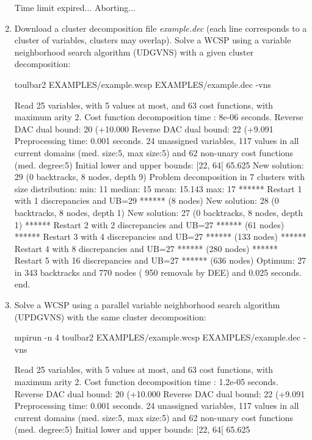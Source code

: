 \begin{enumerate}
{\begin{DoxyCode}
Time limit expired... Aborting...
\end{DoxyCode}}
\item Download a cluster decomposition file {\em example.dec} (each line corresponds to a cluster of variables, clusters may overlap). Solve a WCSP using a variable neighborhood search algorithm (UDGVNS) with a given cluster decomposition:
\begin{DoxyCode}
	toulbar2 EXAMPLES/example.wcsp EXAMPLES/example.dec -vns
\end{DoxyCode}
{\scriptsize
\begin{DoxyCode}
Read 25 variables, with 5 values at most, and 63 cost functions, with maximum arity 2.
Cost function decomposition time : 8e-06 seconds.
Reverse DAC dual bound: 20 (+10.000%
Reverse DAC dual bound: 22 (+9.091%
Preprocessing time: 0.001 seconds.
24 unassigned variables, 117 values in all current domains (med. size:5, max size:5) and 62 non-unary cost functions (med. degree:5)
Initial lower and upper bounds: [22, 64[ 65.625%
New solution: 29 (0 backtracks, 8 nodes, depth 9)
Problem decomposition in 7 clusters with size distribution: min: 11 median: 15 mean: 15.143 max: 17
****** Restart 1 with 1 discrepancies and UB=29 ****** (8 nodes)
New solution: 28 (0 backtracks, 8 nodes, depth 1)
New solution: 27 (0 backtracks, 8 nodes, depth 1)
****** Restart 2 with 2 discrepancies and UB=27 ****** (61 nodes)
****** Restart 3 with 4 discrepancies and UB=27 ****** (133 nodes)
****** Restart 4 with 8 discrepancies and UB=27 ****** (280 nodes)
****** Restart 5 with 16 discrepancies and UB=27 ****** (636 nodes)
Optimum: 27 in 343 backtracks and 770 nodes ( 950 removals by DEE) and 0.025 seconds.
end.
\end{DoxyCode}}
\item Solve a WCSP using a parallel variable neighborhood search algorithm (UPDGVNS) with the same cluster decomposition:
\begin{DoxyCode}
	mpirun -n 4 toulbar2 EXAMPLES/example.wcsp EXAMPLES/example.dec -vns
\end{DoxyCode}
{\scriptsize
\begin{DoxyCode}
Read 25 variables, with 5 values at most, and 63 cost functions, with maximum arity 2.
Cost function decomposition time : 1.2e-05 seconds.
Reverse DAC dual bound: 20 (+10.000%
Reverse DAC dual bound: 22 (+9.091%
Preprocessing time: 0.001 seconds.
24 unassigned variables, 117 values in all current domains (med. size:5, max size:5) and 62 non-unary cost functions (med. degree:5)
Initial lower and upper bounds: [22, 64[ 65.625%

\end{DoxyCode}}
\end{enumerate}

